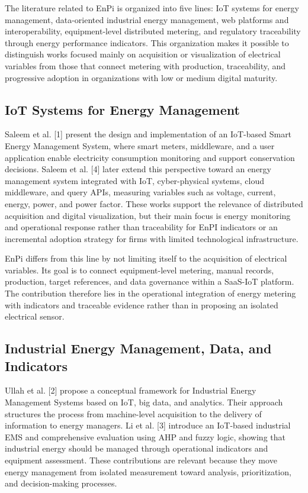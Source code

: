 \documentclass{ieeeaccess}
\begin{document}
The literature related to EnPi is organized into five lines: IoT systems for energy management, data-oriented industrial energy management, web platforms and interoperability, equipment-level distributed metering, and regulatory traceability through energy performance indicators. This organization makes it possible to distinguish works focused mainly on acquisition or visualization of electrical variables from those that connect metering with production, traceability, and progressive adoption in organizations with low or medium digital maturity.

\subsection{IoT Systems for Energy Management}
\label{subsec:iot-systems-energy-management}

Saleem et al. [1] present the design and implementation of an IoT-based Smart Energy Management System, where smart meters, middleware, and a user application enable electricity consumption monitoring and support conservation decisions. Saleem et al. [4] later extend this perspective toward an energy management system integrated with IoT, cyber-physical systems, cloud middleware, and query APIs, measuring variables such as voltage, current, energy, power, and power factor. These works support the relevance of distributed acquisition and digital visualization, but their main focus is energy monitoring and operational response rather than traceability for EnPI indicators or an incremental adoption strategy for firms with limited technological infrastructure.

EnPi differs from this line by not limiting itself to the acquisition of electrical variables. Its goal is to connect equipment-level metering, manual records, production, target references, and data governance within a SaaS-IoT platform. The contribution therefore lies in the operational integration of energy metering with indicators and traceable evidence rather than in proposing an isolated electrical sensor.

\subsection{Industrial Energy Management, Data, and Indicators}
\label{subsec:industrial-energy-management}

Ullah et al. [2] propose a conceptual framework for Industrial Energy Management Systems based on IoT, big data, and analytics. Their approach structures the process from machine-level acquisition to the delivery of information to energy managers. Li et al. [3] introduce an IoT-based industrial EMS and comprehensive evaluation using AHP and fuzzy logic, showing that industrial energy should be managed through operational indicators and equipment assessment. These contributions are relevant because they move energy management from isolated measurement toward analysis, prioritization, and decision-making processes.
\end{document}
